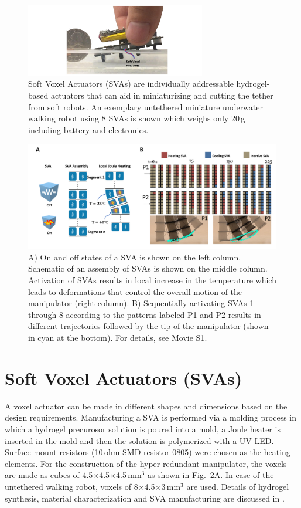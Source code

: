 \begin{figure}[!t]
\centering
\includegraphics[width=0.7\textwidth]{Fig1.pdf}
    \caption{Soft Voxel Actuators (SVAs) are individually addressable hydrogel-based actuators that can aid in miniaturizing and cutting the tether from soft robots. 
    An exemplary untethered miniature underwater walking robot using 8 SVAs is shown which weighs only 20\,g including battery and electronics.}
    \label{fig:concept}
\end{figure}
\begin{figure}[!t]
      \centering
      \includegraphics[width=\textwidth]{Fig2.pdf}
      \caption{A) On and off states of a SVA is shown on the left column. Schematic of an assembly of SVAs is shown on the middle column. Activation of SVAs results in local increase in the temperature which leads to deformations that control the overall motion of the manipulator (right column). B) Sequentially activating SVAs 1 through 8 according to the patterns labeled P1 and P2 results in different trajectories followed by the tip of the manipulator (shown in cyan at the bottom). For details, see Movie S1.}
      \label{fig:treajectory}
   \end{figure}
	
\section{Soft Voxel Actuators (SVAs)}
A voxel actuator can be made in different shapes and dimensions based on the design requirements. Manufacturing a SVA is performed via a molding process in which a hydrogel precurosor solution is poured into a mold, a Joule heater is inserted in the mold and then the solution is polymerized with a UV LED. Surface  mount  resistors  (10\,ohm  SMD  resistor  0805) were chosen as the heating elements. For the construction of the hyper-redundant manipulator, the voxels are made as cubes of 4.5$\times$4.5$\times$4.5\,mm$^3$ as shown in Fig.~\ref{fig:treajectory}A. In case of the untethered walking robot, voxels of 8$\times$4.5$\times$3\,mm$^3$ are used. Details of hydrogel synthesis, material characterization and SVA manufacturing are discussed in \cite{Khodambashi2021}.

